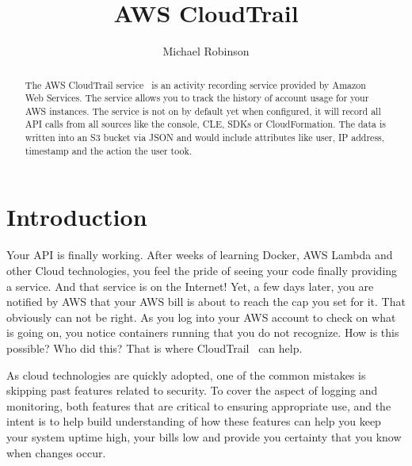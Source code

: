 % 
\title{AWS CloudTrail}

\author{Michael Robinson}


\renewcommand{\shortauthors}{M. Robinson}


\begin{abstract}
The AWS CloudTrail service~\cite{hid-sp18-518-CloudTrail} is an activity 
recording service provided by Amazon Web Services. The service allows you to 
track the history of account usage for your AWS instances. The service is not 
on by default yet when configured, it will record all API calls from all 
sources like the console, CLE, SDKs or CloudFormation. The data is written 
into an S3 bucket via JSON and would include attributes like user, IP address, 
timestamp and the action the user took.
\end{abstract}


\maketitle

\section{Introduction}

Your API is finally working. After weeks of learning Docker, AWS Lambda and 
other Cloud technologies, you feel the pride of seeing your code finally 
providing a service. And that service is on the Internet! Yet, a few days 
later, you are notified by AWS that your AWS bill is about to reach the cap 
you set for it. That obviously can not be right. As you log into your AWS 
account to check on what is going on, you notice containers running that you 
do not recognize. How is this possible? Who did this? That is where 
CloudTrail~\cite{hid-sp18-518-CloudTrail} can help.

As cloud technologies are quickly adopted, one of the common mistakes is 
skipping past features related to security. To cover the aspect of
logging and monitoring, both features that are critical to ensuring 
appropriate use, and the intent is to help build understanding of how these 
features can help you keep your system uptime high, your bills low and provide 
you certainty that you know when changes occur.

